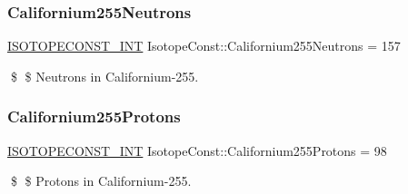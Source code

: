 \subsubsection{\texorpdfstring{Californium255\+Neutrons}{Californium255Neutrons}}
{\footnotesize\ttfamily \mbox{\hyperlink{group___isotope_const-_macros_ga5f18360b3e99483a35c32d789e62621c}{I\+S\+O\+T\+O\+P\+E\+C\+O\+N\+S\+T\+\_\+\+I\+NT}} Isotope\+Const\+::\+Californium255\+Neutrons = 157}

\$ \$ Neutrons in Californium-\/255. \mbox{\label{group___isotope_const-_californium-_cf255_ga9c509d3de0d11ef692c5d9c480cfc8bf}} 
\subsubsection{\texorpdfstring{Californium255\+Protons}{Californium255Protons}}
{\footnotesize\ttfamily \mbox{\hyperlink{group___isotope_const-_macros_ga5f18360b3e99483a35c32d789e62621c}{I\+S\+O\+T\+O\+P\+E\+C\+O\+N\+S\+T\+\_\+\+I\+NT}} Isotope\+Const\+::\+Californium255\+Protons = 98}

\$ \$ Protons in Californium-\/255. 